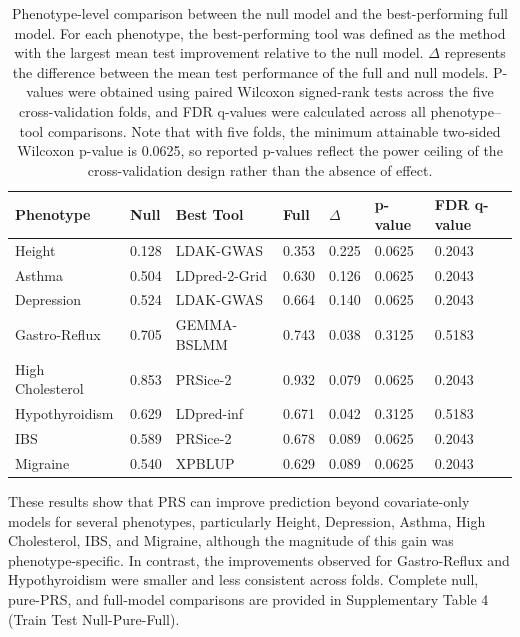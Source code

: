 \documentclass[pdflatex,sn-basic]{sn-jnl}
\begin{document}
\begin{table}[!ht]
\centering
\begin{tabular}{|l|l|l|l|l|l|l|}
\hline
\textbf{Phenotype} & \textbf{Null} & \textbf{Best Tool} & \textbf{Full} & \textbf{$\Delta$} & \textbf{p-value} & \textbf{FDR q-value} \\
\hline
Height & 0.128 & LDAK-GWAS & 0.353 & 0.225 & 0.0625 & 0.2043 \\
\hline
Asthma & 0.504 & LDpred-2-Grid & 0.630 & 0.126 & 0.0625 & 0.2043 \\
\hline
Depression & 0.524 & LDAK-GWAS & 0.664 & 0.140 & 0.0625 & 0.2043 \\
\hline
Gastro-Reflux & 0.705 & GEMMA-BSLMM & 0.743 & 0.038 & 0.3125 & 0.5183 \\
\hline
High Cholesterol & 0.853 & PRSice-2 & 0.932 & 0.079 & 0.0625 & 0.2043 \\
\hline
Hypothyroidism & 0.629 & LDpred-inf & 0.671 & 0.042 & 0.3125 & 0.5183 \\
\hline
IBS & 0.589 & PRSice-2 & 0.678 & 0.089 & 0.0625 & 0.2043 \\
\hline
Migraine & 0.540 & XPBLUP & 0.629 & 0.089 & 0.0625 & 0.2043 \\
\hline
\end{tabular}
\caption{Phenotype-level comparison between the null model and the best-performing full model. For each phenotype, the best-performing tool was defined as the method with the largest mean test improvement relative to the null model. $\Delta$ represents the difference between the mean test performance of the full and null models. P-values were obtained using paired Wilcoxon signed-rank tests across the five cross-validation folds, and FDR q-values were calculated across all phenotype--tool comparisons. Note that with five folds, the minimum attainable two-sided Wilcoxon p-value is 0.0625, so reported p-values reflect the power ceiling of the cross-validation design rather than the absence of effect.}
\label{TablePRSvsNullSummary}
\end{table}

These results show that PRS can improve prediction beyond covariate-only models for several phenotypes, particularly Height, Depression, Asthma, High Cholesterol, IBS, and Migraine, although the magnitude of this gain was phenotype-specific. In contrast, the improvements observed for Gastro-Reflux and Hypothyroidism were smaller and less consistent across folds. Complete null, pure-PRS, and full-model comparisons are provided in Supplementary Table 4 (Train Test Null-Pure-Full).
\end{document}
